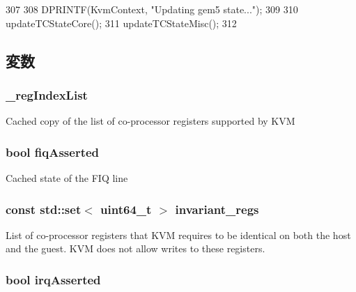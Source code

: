 \begin{DoxyCode}
307 {
308     DPRINTF(KvmContext, "Updating gem5 state...\n");
309 
310     updateTCStateCore();
311     updateTCStateMisc();
312 }
\end{DoxyCode}


\subsection{変数}
\hypertarget{classArmKvmCPU_ada25a9ee0667e58ed655eec2be09b133}{
\subsubsection[{\_\-regIndexList}]{ {\bf \_\-regIndexList}}}
\label{classArmKvmCPU_ada25a9ee0667e58ed655eec2be09b133}
Cached copy of the list of co-\/processor registers supported by KVM \hypertarget{classArmKvmCPU_a980f87872f421bd8c54c0f347ad8bfcc}{
\subsubsection[{fiqAsserted}]{\setlength{\rightskip}{0pt plus 5cm}bool {\bf fiqAsserted}}}
\label{classArmKvmCPU_a980f87872f421bd8c54c0f347ad8bfcc}
Cached state of the FIQ line \hypertarget{classArmKvmCPU_a0183ebe7a406948461e8b808c5a3677d}{
\subsubsection[{invariant\_\-regs}]{\setlength{\rightskip}{0pt plus 5cm}const std::set$<$ uint64\_\-t $>$ {\bf invariant\_\-regs}}}
\label{classArmKvmCPU_a0183ebe7a406948461e8b808c5a3677d}
List of co-\/processor registers that KVM requires to be identical on both the host and the guest. KVM does not allow writes to these registers. \hypertarget{classArmKvmCPU_af61d21c5b06aff9f758f797b2c8d422f}{
\subsubsection[{irqAsserted}]{\setlength{\rightskip}{0pt plus 5cm}bool {\bf irqAsserted}}}
